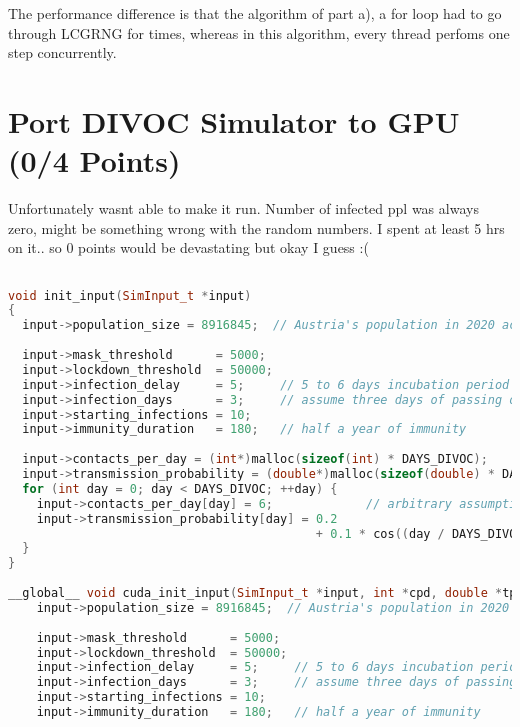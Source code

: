 The performance difference is that the algorithm of part a), a for loop had to go through LCGRNG for 
times, whereas in this algorithm, every thread perfoms one step concurrently.

\section{Port DIVOC Simulator to GPU (0/4 Points)}

Unfortunately wasnt able to make it run. Number of infected ppl was always zero, might be something wrong with the
random numbers. I spent at least 5 hrs on it.. so 0 points would be devastating but okay I guess :(

\begin{lstlisting}[language=C++, title=C++ code for ]

void init_input(SimInput_t *input) 
{
  input->population_size = 8916845;  // Austria's population in 2020 according to Statistik Austria
 
  input->mask_threshold      = 5000;
  input->lockdown_threshold  = 50000;
  input->infection_delay     = 5;     // 5 to 6 days incubation period (average) according to WHO
  input->infection_days      = 3;     // assume three days of passing on the disease
  input->starting_infections = 10;
  input->immunity_duration   = 180;   // half a year of immunity
 
  input->contacts_per_day = (int*)malloc(sizeof(int) * DAYS_DIVOC);
  input->transmission_probability = (double*)malloc(sizeof(double) * DAYS_DIVOC);
  for (int day = 0; day < DAYS_DIVOC; ++day) {
    input->contacts_per_day[day] = 6;             // arbitrary assumption of six possible transmission contacts per person per day, all year
    input->transmission_probability[day] = 0.2
                                           + 0.1 * cos((day / DAYS_DIVOC) * 2 * M_PI);   // higher transmission in winter, lower transmission during summer
  }
}
 
__global__ void cuda_init_input(SimInput_t *input, int *cpd, double *tp) {
    input->population_size = 8916845;  // Austria's population in 2020 according to Statistik Austria
    
    input->mask_threshold      = 5000;
    input->lockdown_threshold  = 50000;
    input->infection_delay     = 5;     // 5 to 6 days incubation period (average) according to WHO
    input->infection_days      = 3;     // assume three days of passing on the disease
    input->starting_infections = 10;
    input->immunity_duration   = 180;   // half a year of immunity


\end{lstlisting}
